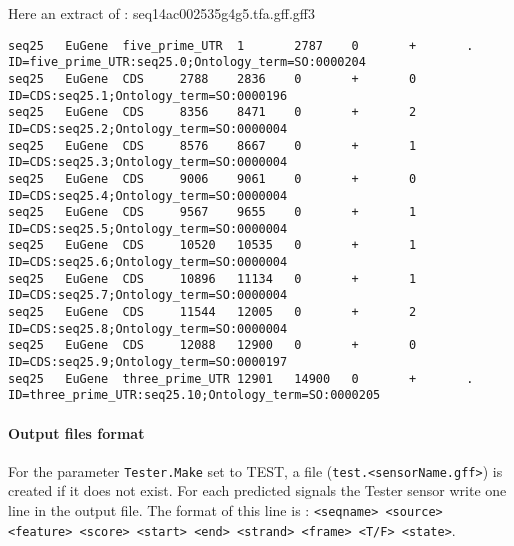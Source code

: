 Here an extract of : seq14ac002535g4g5.tfa.gff.gff3
\begin{Verbatim}[fontsize=\tiny]
seq25   EuGene  five_prime_UTR  1       2787    0       +       .       ID=five_prime_UTR:seq25.0;Ontology_term=SO:0000204
seq25   EuGene  CDS     2788    2836    0       +       0       ID=CDS:seq25.1;Ontology_term=SO:0000196
seq25   EuGene  CDS     8356    8471    0       +       2       ID=CDS:seq25.2;Ontology_term=SO:0000004
seq25   EuGene  CDS     8576    8667    0       +       1       ID=CDS:seq25.3;Ontology_term=SO:0000004
seq25   EuGene  CDS     9006    9061    0       +       0       ID=CDS:seq25.4;Ontology_term=SO:0000004
seq25   EuGene  CDS     9567    9655    0       +       1       ID=CDS:seq25.5;Ontology_term=SO:0000004
seq25   EuGene  CDS     10520   10535   0       +       1       ID=CDS:seq25.6;Ontology_term=SO:0000004
seq25   EuGene  CDS     10896   11134   0       +       1       ID=CDS:seq25.7;Ontology_term=SO:0000004
seq25   EuGene  CDS     11544   12005   0       +       2       ID=CDS:seq25.8;Ontology_term=SO:0000004
seq25   EuGene  CDS     12088   12900   0       +       0       ID=CDS:seq25.9;Ontology_term=SO:0000197
seq25   EuGene  three_prime_UTR 12901   14900   0       +       .       ID=three_prime_UTR:seq25.10;Ontology_term=SO:0000205
\end{Verbatim}


\paragraph{Output files format}

For the parameter \texttt{Tester.Make} set to TEST, a file
(\texttt{test.<sensorName.gff>}) is created if it does not exist.  For each
predicted signals the Tester sensor write one line in the output file.
The format of this line is : \texttt{<seqname> <source> <feature>
  <score>
  <start> <end> <strand> <frame> <T/F> <state>}.

